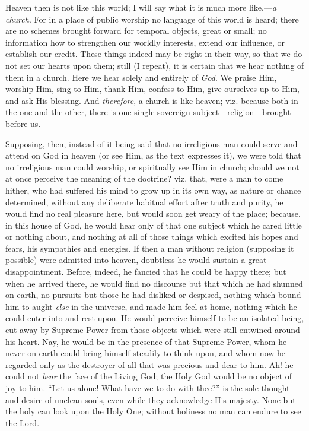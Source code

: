 Heaven then is not like this world; I will say what it
is much more like,—\emph{a church}. For in a place
of public worship no language of this world is heard;
there are no schemes brought forward for temporal
objects, great or small; no information how to strengthen
our worldly interests, extend our influence, or establish
our credit. These things indeed may be right in their
way, so that we do not set our hearts upon them; still (I
repeat), it is certain that we hear nothing of them in a
church. Here we hear solely and entirely of \emph{God}.
We praise Him, worship Him, sing to Him, thank Him,
confess to Him, give ourselves up to Him, and ask His
blessing. And \emph{therefore}, a church is like
heaven; viz. because both in the one and the other, there
is one single sovereign
subject—religion—brought before us.

Supposing, then, instead of it being said that no
irreligious man could serve and attend on God in heaven
(or see Him, as the text expresses it), we were told that
no irreligious man could worship, or spiritually see Him
in church; should we not at once perceive the meaning of
the doctrine? viz. that, were a man to come hither, who
had suffered his mind to grow up in its own way, as
nature or chance determined, without any deliberate
habitual effort after truth and purity, he would find no
real pleasure here, but would soon get weary of the
place; because, in this house of God, he would hear only
of that one subject which he cared little or nothing
about, and nothing at all of those things which excited
his hopes and fears, his sympathies and energies. If then
a man without religion (supposing it possible) were
admitted into heaven, doubtless he would sustain a great
disappointment. Before, indeed, he fancied that he could be happy there; but when he arrived there, he would find
no discourse but that which he had shunned on earth, no
pursuits but those he had disliked or despised, nothing
which bound him to aught \emph{else} in the universe,
and made him feel at home, nothing which he could enter
into and rest upon. He would perceive himself to be an
isolated being, cut away by Supreme Power from those
objects which were still entwined around his heart. Nay,
he would be in the presence of that Supreme Power, whom
he never on earth could bring himself steadily to think
upon, and whom now he regarded only as the destroyer of
all that was precious and dear to him. Ah! he could not \emph{bear}
the face of the Living God; the Holy God would be no
object of joy to him. ``Let us alone! What have we to
do with thee?'' is the sole thought and desire of
unclean souls, even while they acknowledge His majesty.
None but the holy can look upon the Holy One; without
holiness no man can endure to see the Lord.

